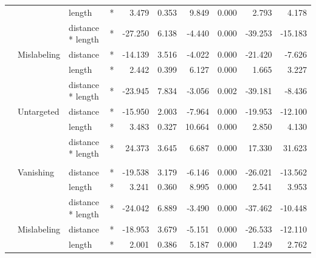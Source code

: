 \begin{longtable}[t]{llllrrrrrr}
\cmidrule{3-10}\nopagebreak
\hspace{1em} &  & length & * & 3.479 & 0.353 & 9.849 & 0.000 & 2.793 & 4.178\\
\cmidrule{3-10}\nopagebreak
\hspace{1em} &  & distance * length & * & -27.250 & 6.138 & -4.440 & 0.000 & -39.253 & -15.183\\
\cmidrule{2-10}\nopagebreak
\hspace{1em} & Mislabeling & distance & * & -14.139 & 3.516 & -4.022 & 0.000 & -21.420 & -7.626\\
\cmidrule{3-10}\nopagebreak
\hspace{1em} &  & length & * & 2.442 & 0.399 & 6.127 & 0.000 & 1.665 & 3.227\\
\cmidrule{3-10}\nopagebreak
\hspace{1em} &  & distance * length & * & -23.945 & 7.834 & -3.056 & 0.002 & -39.181 & -8.436\\
\cmidrule{2-10}\nopagebreak
\hspace{1em} & Untargeted & distance & * & -15.950 & 2.003 & -7.964 & 0.000 & -19.953 & -12.100\\
\cmidrule{3-10}\nopagebreak
\hspace{1em} &  & length & * & 3.483 & 0.327 & 10.664 & 0.000 & 2.850 & 4.130\\
\cmidrule{3-10}\nopagebreak
\hspace{1em} &  & distance * length & * & 24.373 & 3.645 & 6.687 & 0.000 & 17.330 & 31.623\\
\cmidrule{1-10}\pagebreak[0]
\addlinespace[0.3em]
\multicolumn{10}{l}{\textbf{Faster R-CNN}}\\
\hspace{1em} & Vanishing & distance & * & -19.538 & 3.179 & -6.146 & 0.000 & -26.021 & -13.562\\
\cmidrule{3-10}\nopagebreak
\hspace{1em} &  & length & * & 3.241 & 0.360 & 8.995 & 0.000 & 2.541 & 3.953\\
\cmidrule{3-10}\nopagebreak
\hspace{1em} &  & distance * length & * & -24.042 & 6.889 & -3.490 & 0.000 & -37.462 & -10.448\\
\cmidrule{2-10}\nopagebreak
\hspace{1em} & Mislabeling & distance & * & -18.953 & 3.679 & -5.151 & 0.000 & -26.533 & -12.110\\
\cmidrule{3-10}\nopagebreak
\hspace{1em} &  & length & * & 2.001 & 0.386 & 5.187 & 0.000 & 1.249 & 2.762\\

\end{longtable}
